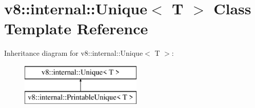 \hypertarget{classv8_1_1internal_1_1_unique}{}\section{v8\+:\+:internal\+:\+:Unique$<$ T $>$ Class Template Reference}
\label{classv8_1_1internal_1_1_unique}
Inheritance diagram for v8\+:\+:internal\+:\+:Unique$<$ T $>$\+:\begin{figure}[H]
\begin{center}
\leavevmode
\includegraphics[height=2.000000cm]{classv8_1_1internal_1_1_unique}
\end{center}
\end{figure}
